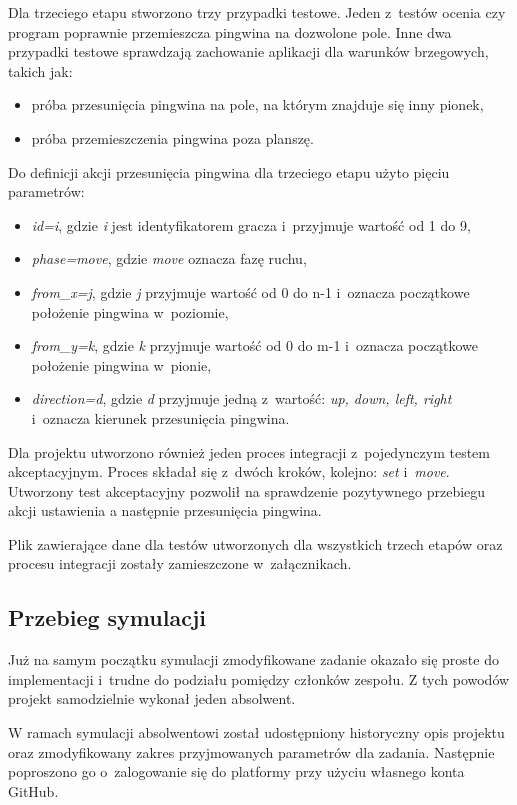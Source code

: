 Dla trzeciego etapu stworzono trzy przypadki testowe.
Jeden z~testów ocenia czy program poprawnie przemieszcza pingwina na dozwolone pole.
Inne dwa przypadki testowe sprawdzają zachowanie aplikacji dla warunków brzegowych, takich jak:
\begin{itemize}
    \item próba przesunięcia pingwina na pole, na którym znajduje się inny pionek,
    \item próba przemieszczenia pingwina poza planszę.
\end{itemize}

Do definicji akcji przesunięcia pingwina dla trzeciego etapu użyto pięciu parametrów:
\begin{itemize}
    \item \textit{id=i}, gdzie \textit{i} jest identyfikatorem gracza i~przyjmuje wartość od 1 do 9,
    \item \textit{phase=move}, gdzie \textit{move} oznacza fazę ruchu,
    \item \textit{from\_x=j}, gdzie \textit{j} przyjmuje wartość od 0 do n-1 i~oznacza początkowe położenie pingwina w~poziomie,
    \item \textit{from\_y=k}, gdzie \textit{k} przyjmuje wartość od 0 do m-1 i~oznacza początkowe położenie pingwina w~pionie,
    \item \textit{direction=d}, gdzie \textit{d} przyjmuje jedną z~wartość: \textit{up, down, left, right} i~oznacza kierunek przesunięcia pingwina.
\end{itemize}

Dla projektu utworzono również jeden proces integracji z~pojedynczym testem akceptacyjnym.
Proces składał się z~dwóch kroków, kolejno: \textit{set} i~\textit{move}.
Utworzony test akceptacyjny pozwolił na sprawdzenie pozytywnego przebiegu akcji ustawienia a następnie przesunięcia pingwina.

Plik zawierające dane dla testów utworzonych dla wszystkich trzech etapów oraz procesu integracji zostały zamieszczone w~załącznikach.

\subsection{Przebieg symulacji}
\label{penguins_simulation}
Już na samym początku symulacji zmodyfikowane zadanie okazało się proste do implementacji i~trudne do podziału pomiędzy członków zespołu.
Z tych powodów projekt samodzielnie wykonał jeden absolwent.

W ramach symulacji absolwentowi został udostępniony historyczny opis projektu oraz zmodyfikowany zakres przyjmowanych parametrów dla zadania.
Następnie poproszono go o~zalogowanie się do platformy przy użyciu własnego konta GitHub.

